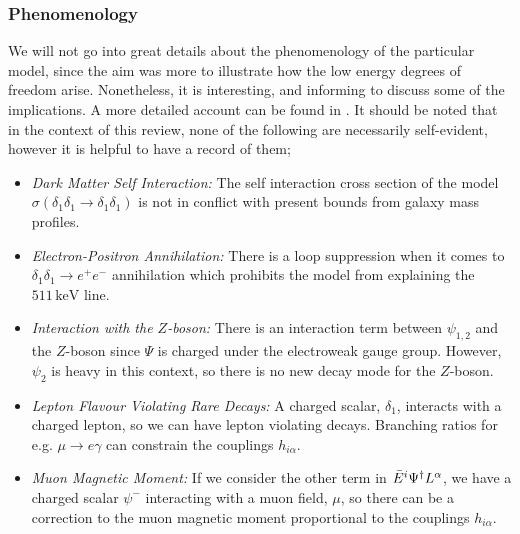 \documentclass[10pt]{article}
\begin{document}
\subsubsection{Phenomenology}
We will not go into great details about the phenomenology of the particular model, since the aim was more to illustrate how the low energy degrees of freedom arise. Nonetheless, it is interesting, and informing to discuss some of the implications. A more detailed account can be found in \cite{Farzan2009}. It should be noted that in the context of this review, none of the following are necessarily self-evident, however it is helpful to have a record of them;
\begin{itemize}
  \item \textit{Dark Matter Self Interaction:} The self interaction cross section of the model $\sigma(\delta_1 \delta_1 \rightarrow \delta_1 \delta_1)$ is not in conflict with present bounds from galaxy mass profiles.
  \item \textit{Electron-Positron Annihilation:} There is a loop suppression when it comes to $\delta_1 \delta_1 \rightarrow e^+ e^-$ annihilation which prohibits the model from explaining the $511 \, \text{keV}$ line.
  \item \textit{Interaction with the $Z$-boson:} There is an interaction term between $\psi_{1,2}$ and the $Z$-boson since $\Psi$ is charged under the electroweak gauge group. However, $\psi_2$ is heavy in this context, so there is no new decay mode for the $Z$-boson.
  \item \textit{Lepton Flavour Violating Rare Decays:} A charged scalar, $\delta_1$, interacts with a charged lepton, so we can have lepton violating decays. Branching ratios for e.g. $\mu \rightarrow e\gamma$ can constrain the couplings $h_{i\alpha}$.
  \item \textit{Muon Magnetic Moment:} If we consider the other term in $\bar{E}^i\Psi^{\dagger} L^\alpha$, we have a charged scalar $\psi^-$ interacting with a muon field, $\mu$, so there can be a correction to the muon magnetic moment proportional to the couplings $h_{i\alpha}$.
\end{itemize}
\end{document}
